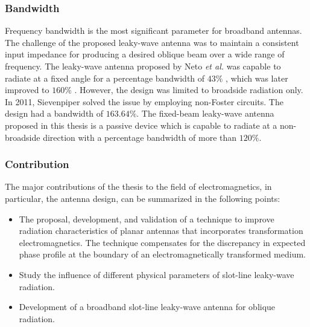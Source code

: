 \subsubsection*{Bandwidth}
Frequency bandwidth is the most significant parameter for broadband antennas. The challenge of the proposed leaky-wave antenna was to maintain a consistent input impedance for producing a desired oblique beam over a wide range of frequency. The leaky-wave antenna proposed by Neto \textit{et al.} was capable to radiate at a fixed angle for a percentage bandwidth of $43\%$ \cite{Neto2005}, which was later improved to $160\%$ \cite{Bruni2007}. However, the design was limited to broadside radiation only. In 2011, Sievenpiper solved the issue by employing non-Foster circuits. The design had a bandwidth of $163.64 \% $\cite{Sievenpiper2011}. The fixed-beam leaky-wave antenna proposed in this thesis is a passive device which is capable to radiate at a non-broadside direction with a percentage bandwidth of more than $120 \%$. %

\subsubsection{Contribution}

The major contributions of the thesis to the field of electromagnetics, in particular, the antenna design, can be summarized in the following points: %
\begin{itemize}
    \item The proposal, development, and validation of a technique to improve radiation characteristics of planar antennas that incorporates transformation electromagnetics. The technique compensates for the discrepancy in expected phase profile at the boundary of an electromagnetically transformed medium. 
    \item Study the influence of different physical parameters of slot-line leaky-wave radiation.
    \item Development of a broadband slot-line leaky-wave antenna for oblique radiation.
\end{itemize}



